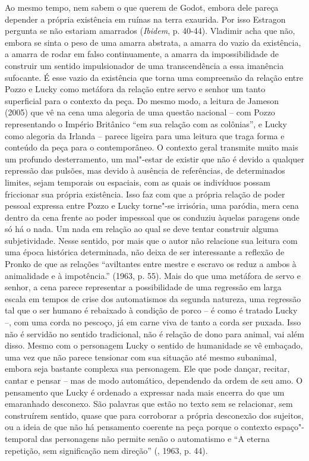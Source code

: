 Ao mesmo tempo, nem sabem o que querem de Godot, embora dele pareça
depender a própria existência em ruínas na terra exaurida. Por isso
Estragon pergunta se não estariam amarrados (\emph{Ibidem}, p. 40-44).
Vladimir acha que não, embora se sinta o peso de uma amarra abstrata, a
amarra do vazio da existência, a amarra de rodar em falso continuamente,
a amarra da impossibilidade de construir um sentido impulsionador de uma
transcendência a essa imanência sufocante. É esse vazio da existência
que torna uma compreensão da relação entre Pozzo e Lucky como metáfora
da relação entre servo e senhor um tanto superficial para o contexto da
peça. Do mesmo modo, a leitura de Jameson (2005) que vê na cena uma
alegoria de uma questão nacional -- com Pozzo representando o Império
Britânico ``em sua relação com as colônias'', e Lucky como alegoria da
Irlanda -- parece ligeira para uma leitura que traga forma e conteúdo da
peça para o contemporâneo. O contexto geral transmite muito mais um
profundo desterramento, um mal"-estar de existir que não é devido a
qualquer repressão das pulsões, mas devido à ausência de referências, de
determinados limites, sejam temporais ou espaciais, com as quais os
indivíduos possam friccionar sua própria existência. Isso faz com que a
própria relação de poder pessoal expressa entre Pozzo e Lucky torne"-se
irrisória, uma paródia, mera cena dentro da cena frente ao poder
impessoal que os conduziu àquelas paragens onde só há o nada. Um nada em
relação ao qual se deve tentar construir alguma subjetividade. Nesse
sentido, por mais que o autor não relacione sua leitura com uma época
histórica determinada, não deixa de ser interessante a reflexão de
Pronko de que as relações ``aviltantes entre mestre e escravo os reduz a
ambos à animalidade e à impotência.'' (1963, p. 55). Mais do que uma
metáfora de servo e senhor, a cena parece representar a possibilidade de
uma regressão em larga escala em tempos de crise dos automatismos da
segunda natureza, uma regressão tal que o ser humano é rebaixado à
condição de porco -- é como é tratado Lucky --, com uma corda no
pescoço, já em carne viva de tanto a corda ser puxada. Isso não é
servidão no sentido tradicional, não é relação de dono para animal, vai
além disso. Mesmo com o personagem Lucky o sentido de humanidade se vê
embaçado, uma vez que não parece tensionar com sua situação até mesmo
subanimal, embora seja bastante complexa sua personagem. Ele que pode
dançar, recitar, cantar e pensar -- mas de modo automático, dependendo
da ordem de seu amo. O pensamento que Lucky é ordenado a expressar nada
mais encerra do que um emaranhado desconexo. São palavras que estão no
texto sem se relacionar, sem construírem sentido, quase que para
corroborar a própria desconexão dos sujeitos, ou a ideia de que não há
pensamento coerente na peça porque o contexto espaço"-temporal das
personagens não permite senão o automatismo e ``A eterna repetição, sem
significação nem direção'' (, 1963, p. 44).

